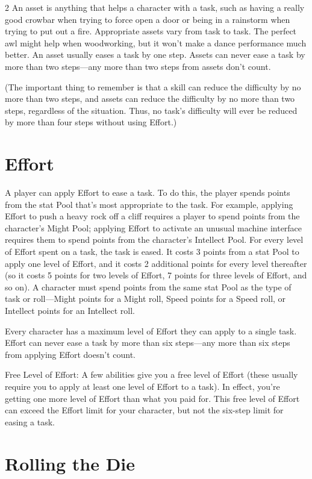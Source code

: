 \begin{multicols}{2}
An asset is anything that helps a character with a task, such as having a really good crowbar when trying to force open a door or being in a rainstorm when trying to put out a fire. Appropriate assets vary from task to task. The perfect awl might help when woodworking, but it won’t make a dance performance much better. An asset usually eases a task by one step. Assets can never ease a task by more than two steps—any more than two steps from assets don’t count.

(The important thing to remember is that a skill can reduce the difficulty by no more than two steps, and assets can reduce the difficulty by no more than two steps, regardless of the situation. Thus, no task’s difficulty will ever be reduced by more than four steps without using Effort.)

\section{Effort}

A player can apply Effort to ease a task. To do this, the player spends points from the stat Pool that’s most appropriate to the task. For example, applying Effort to push a heavy rock off a cliff requires a player to spend points from the character’s Might Pool; applying Effort to activate an unusual machine interface requires them to spend points from the character’s Intellect Pool. For every level of Effort spent on a task, the task is eased. It costs 3 points from a stat Pool to apply one level of Effort, and it costs 2 additional points for every level thereafter (so it costs 5 points for two levels of Effort, 7 points for three levels of Effort, and so on). A character must spend points from the same stat Pool as the type of task or roll—Might points for a Might roll, Speed points for a Speed roll, or Intellect points for an Intellect roll.

Every character has a maximum level of Effort they can apply to a single task. Effort can never ease a task by more than six steps—any more than six steps from applying Effort doesn’t count.

Free Level of Effort: A few abilities give you a free level of Effort (these usually require you to apply at least one level of Effort to a task). In effect, you’re getting one more level of Effort than what you paid for. This free level of Effort can exceed the Effort limit for your character, but not the six-step limit for easing a task.

\section{Rolling the Die}


\end{multicols}
